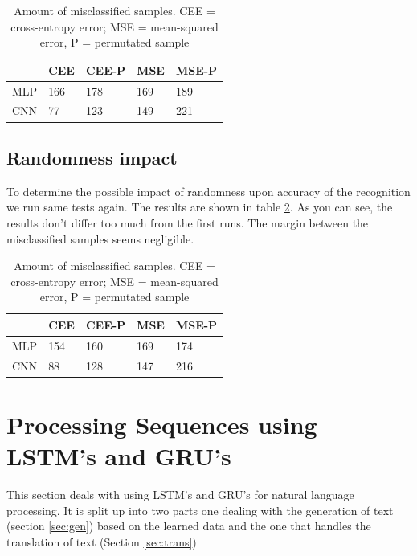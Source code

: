\documentclass{article}[]
\begin{document}
\begin{table}[H]
	\centering
	\begin{tabular}{|l|l|l|l|l|}
		\hline
		& \cellcolor[HTML]{C0C0C0}CEE & \cellcolor[HTML]{C0C0C0}CEE-P & \cellcolor[HTML]{C0C0C0}MSE & \cellcolor[HTML]{C0C0C0}MSE-P \\ \hline
		\cellcolor[HTML]{C0C0C0}MLP & \cellcolor[HTML]{FFFFFF}166 & 178                           & 169                         & 189                           \\ \hline
		\cellcolor[HTML]{C0C0C0}CNN & 77                          & 123                           & 149                         & 221                           \\ \hline
	\end{tabular}
	\caption{Amount of misclassified samples. CEE = cross-entropy error; MSE = mean-squared error, P = permutated sample}
	\label{table-1}
\end{table}

\subsection{Randomness impact}
To determine the possible impact of randomness upon accuracy of the recognition we run same tests again.
The results are shown in table \ref{table-2}.
As you can see, the results don't differ too much from the first runs.
The margin between the misclassified samples seems negligible.


\begin{table}[H]
	\centering
	\begin{tabular}{|l|l|l|l|l|}
		\hline
		& \cellcolor[HTML]{C0C0C0}CEE & \cellcolor[HTML]{C0C0C0}CEE-P & \cellcolor[HTML]{C0C0C0}MSE & \cellcolor[HTML]{C0C0C0}MSE-P \\ \hline
		\cellcolor[HTML]{C0C0C0}MLP & \cellcolor[HTML]{FFFFFF}154 & 160                           & 169                         & 174                           \\ \hline
		\cellcolor[HTML]{C0C0C0}CNN & 88                          & 128                           & 147                         & 216                           \\ \hline
	\end{tabular}
	\caption{Amount of misclassified samples. CEE = cross-entropy error; MSE = mean-squared error, P = permutated sample}
	\label{table-2}
\end{table}

\section{Processing Sequences using LSTM's and GRU's}
\label{sec:seq}
This section deals with using LSTM's and GRU's for natural language processing.
It is split up into two parts one dealing with the generation of text (section \ref{sec:gen}) based on the learned data and the one that handles the translation of text (Section \ref{sec:trans})
\end{document}
